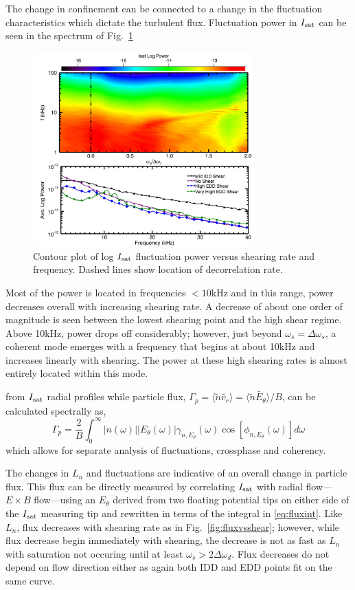 \documentclass[aps,prl,amsmath,amssymb,preprint,superscriptaddress]{revtex4}
\begin{document}
The change in confinement can be connected to a change in the fluctuation characteristics which dictate the turbulent flux. Fluctuation power in $I_{\rm sat}$ can be seen in the spectrum of Fig.~\ref{fig:powercontour}
\begin{figure}[!htbp]
\centerline{
\includegraphics[width=8.5cm]{powercontour.pdf}}
\caption{\label{fig:powercontour} Contour plot of log $I_{\rm sat}$ fluctuation power versus shearing rate and frequency. Dashed lines show location of decorrelation rate.}
\end{figure}
Most of the power is located in frequencies $<10$kHz and in this range, power decreases overall with increasing shearing rate. A decrease of about one order of magnitude is seen between the lowest shearing point and the high shear regime. Above 10kHz, power drops off considerably; however, just beyond $\omega_{s} = \Delta \omega_{s}$, a coherent mode emerges with a frequency that begins at about 10kHz and increases linearly with shearing. The power at these high shearing rates is almost entirely located within this mode.


 from $I_{\rm sat}$ radial profiles while particle flux, $\Gamma_{p} = \langle \tilde{n} \tilde{v_{r}} \rangle = \langle \tilde{n} \tilde{E_{\theta}} \rangle /B$, can be calculated spectrally as\cite{powers74}, 
\begin{equation}
\Gamma_{p} = \frac{2}{B} \int^{\infty}_{0} \lvert n(\omega) \rvert \lvert E_{\theta}(\omega) \rvert \gamma_{n,E_{\theta}}(\omega) \cos [\phi_{n,E_{\theta}}(\omega)] d\omega
\label{eq:fluxint}
\end{equation}
which allows for separate analysis of fluctuations, crossphase and coherency.




The changes in $L_{n}$ and fluctuations are indicative of an overall change in particle flux. This flux can be directly measured by correlating $I_{\rm sat}$ with radial flow---$E \times B$ flow---using an $E_{\theta}$ derived from two floating potential tips on either side of the $I_{\rm sat}$ measuring tip and rewritten in terms of the integral in \eqref{eq:fluxint}. Like $L_{n}$, flux decreases with shearing rate as in Fig.~\ref{fig:fluxvsshear}; however, while flux decrease begin immediately with shearing, the decrease is not as fast as $L_{n}$ with saturation not occuring until at least $\omega_{s} > 2\Delta \omega_{d}$. Flux decreases do not depend on flow direction either as again both IDD and EDD points fit on the same curve.
\end{document}

